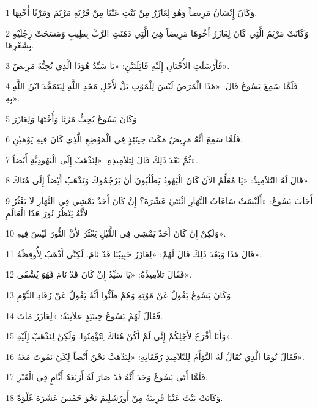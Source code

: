\par 1 وَكَانَ إِنْسَانٌ مَرِيضاً وَهُوَ لِعَازَرُ مِنْ بَيْتِ عَنْيَا مِنْ قَرْيَةِ مَرْيَمَ وَمَرْثَا أُخْتِهَا.
\par 2 وَكَانَتْ مَرْيَمُ الَّتِي كَانَ لِعَازَرُ أَخُوهَا مَرِيضاً هِيَ الَّتِي دَهَنَتِ الرَّبَّ بِطِيبٍ وَمَسَحَتْ رِجْلَيْهِ بِشَعْرِهَا.
\par 3 فَأَرْسَلَتِ الأُخْتَانِ إِلَيْهِ قَائِلَتَيْنِ: «يَا سَيِّدُ هُوَذَا الَّذِي تُحِبُّهُ مَرِيضٌ».
\par 4 فَلَمَّا سَمِعَ يَسُوعُ قَالَ: «هَذَا الْمَرَضُ لَيْسَ لِلْمَوْتِ بَلْ لأَجْلِ مَجْدِ اللَّهِ لِيَتَمَجَّدَ ابْنُ اللَّهِ بِهِ».
\par 5 وَكَانَ يَسُوعُ يُحِبُّ مَرْثَا وَأُخْتَهَا وَلِعَازَرَ.
\par 6 فَلَمَّا سَمِعَ أَنَّهُ مَرِيضٌ مَكَثَ حِينَئِذٍ فِي الْمَوْضِعِ الَّذِي كَانَ فِيهِ يَوْمَيْنِ.
\par 7 ثُمَّ بَعْدَ ذَلِكَ قَالَ لِتلاَمِيذِهِ: «لِنَذْهَبْ إِلَى الْيَهُودِيَّةِ أَيْضاً».
\par 8 قَالَ لَهُ التّلاَمِيذُ: «يَا مُعَلِّمُ الآنَ كَانَ الْيَهُودُ يَطْلُبُونَ أَنْ يَرْجُمُوكَ وَتَذْهَبُ أَيْضاً إِلَى هُنَاكَ».
\par 9 أَجَابَ يَسُوعُ: «أَلَيْسَتْ سَاعَاتُ النَّهَارِ اثْنَتَيْ عَشْرَةَ؟ إِنْ كَانَ أَحَدٌ يَمْشِي فِي النَّهَارِ لاَ يَعْثُرُ لأَنَّهُ يَنْظُرُ نُورَ هَذَا الْعَالَمِ
\par 10 وَلَكِنْ إِنْ كَانَ أَحَدٌ يَمْشِي فِي اللَّيْلِ يَعْثُرُ لأَنَّ النُّورَ لَيْسَ فِيهِ».
\par 11 قَالَ هَذَا وَبَعْدَ ذَلِكَ قَالَ لَهُمْ: «لِعَازَرُ حَبِيبُنَا قَدْ نَامَ. لَكِنِّي أَذْهَبُ لِأُوقِظَهُ».
\par 12 فَقَالَ تلاَمِيذُهُ: «يَا سَيِّدُ إِنْ كَانَ قَدْ نَامَ فَهُوَ يُشْفَى».
\par 13 وَكَانَ يَسُوعُ يَقُولُ عَنْ مَوْتِهِ وَهُمْ ظَنُّوا أَنَّهُ يَقُولُ عَنْ رُقَادِ النَّوْمِ.
\par 14 فَقَالَ لَهُمْ يَسُوعُ حِينَئِذٍ علاَنِيَةً: «لِعَازَرُ مَاتَ.
\par 15 وَأَنَا أَفْرَحُ لأَجْلِكُمْ إِنِّي لَمْ أَكُنْ هُنَاكَ لِتُؤْمِنُوا. وَلَكِنْ لِنَذْهَبْ إِلَيْهِ».
\par 16 فَقَالَ تُومَا الَّذِي يُقَالُ لَهُ التَّوْأَمُ لِلتّلاَمِيذِ رُفَقَائِهِ: «لِنَذْهَبْ نَحْنُ أَيْضاً لِكَيْ نَمُوتَ مَعَهُ».
\par 17 فَلَمَّا أَتَى يَسُوعُ وَجَدَ أَنَّهُ قَدْ صَارَ لَهُ أَرْبَعَةُ أَيَّامٍ فِي الْقَبْرِ.
\par 18 وَكَانَتْ بَيْتُ عَنْيَا قَرِيبَةً مِنْ أُورُشَلِيمَ نَحْوَ خَمْسَ عَشْرَةَ غَلْوَةً.
